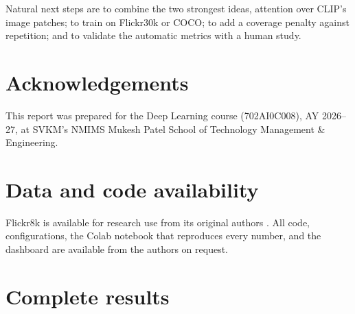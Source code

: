 \documentclass[11pt]{article}
\begin{document}
Natural next steps are to combine the two strongest ideas, attention over CLIP's image patches; to train on Flickr30k or COCO; to add a coverage penalty against repetition; and to validate the automatic metrics with a human study.

\section*{Acknowledgements}
This report was prepared for the Deep Learning course (702AI0C008), AY 2026--27, at SVKM's NMIMS Mukesh Patel School of Technology Management \& Engineering.

\section*{Data and code availability}
Flickr8k is available for research use from its original authors \cite{hodosh2013}. All code, configurations, the Colab notebook that reproduces every number, and the dashboard are available from the authors on request.

\small


\clearpage
\appendix
\section{Complete results}
\end{document}
